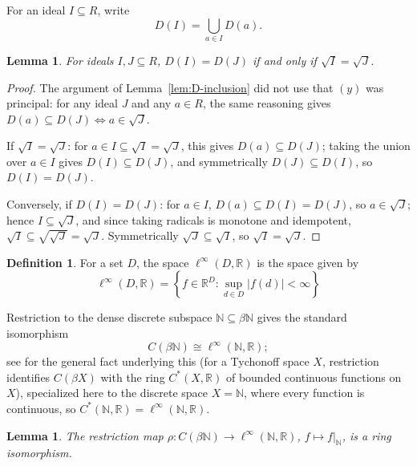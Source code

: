 \documentclass{amsart}
\newtheorem{lemma}[theorem]{Lemma}
\theoremstyle{definition}
\newtheorem{definition}[theorem]{Definition}
\theoremstyle{remark}
\newcommand{\nat}{\mathbb N}
\newcommand{\reals}{\mathbb R}
\newcommand{\cont}[1]{C\left(#1\right)}
\newcommand{\linfty}{\ell^\infty}
\begin{document}
For an ideal $I\subseteq R$, write
\[
D(I)=\bigcup_{a\in I}D(a).
\]

\begin{lemma}\label{lem:D-equality}
For ideals $I,J\subseteq R$, $D(I)=D(J)$ if and only if $\sqrt I=\sqrt J$.
\end{lemma}

\begin{proof}
The argument of Lemma~\ref{lem:D-inclusion} did not use that $(y)$ was
principal: for any ideal $J$ and any $a\in R$, the same reasoning gives
$D(a)\subseteq D(J)\iff a\in\sqrt J$.

If $\sqrt I=\sqrt J$: for $a\in I\subseteq\sqrt I=\sqrt J$, this gives
$D(a)\subseteq D(J)$; taking the union over $a\in I$ gives
$D(I)\subseteq D(J)$, and symmetrically $D(J)\subseteq D(I)$, so
$D(I)=D(J)$.

Conversely, if $D(I)=D(J)$: for $a\in I$, $D(a)\subseteq D(I)=D(J)$, so
$a\in\sqrt J$; hence $I\subseteq\sqrt J$, and since taking radicals is
monotone and idempotent, $\sqrt I\subseteq\sqrt{\sqrt J}=\sqrt J$.
Symmetrically $\sqrt J\subseteq\sqrt I$, so $\sqrt I=\sqrt J$.
\end{proof}

\begin{definition}
  For a set $D$, 
  the space $\linfty{(D,\reals)}$ is the space given by
\[\linfty{(D,\reals)} = 
\left\{
f\in \reals^D
: 
\sup_{d\in D}|f(d)|<\infty
\right\}\]
\end{definition}

Restriction to the dense discrete subspace $\nat\subseteq\beta\nat$ gives the
standard isomorphism
\[
\cont{\beta\nat}\cong\linfty(\nat,\reals);
\]
see \cite[6.5(II), 6.6(b)]{GillmanJerison} for the general fact underlying
this (for a Tychonoff space $X$, restriction identifies $\cont{\beta X}$
with the ring $C^\ast(X,\reals)$ of bounded continuous functions on $X$),
specialized here to the discrete space $X=\nat$, where every function is
continuous, so $C^\ast(\nat,\reals)=\linfty(\nat,\reals)$.

\begin{lemma}\label{lem:beta-nat-iso}
The restriction map $\rho:\cont{\beta\nat}\to\linfty(\nat,\reals)$,
$f\mapsto f|_\nat$, is a ring isomorphism.
\end{lemma}
\end{document}

